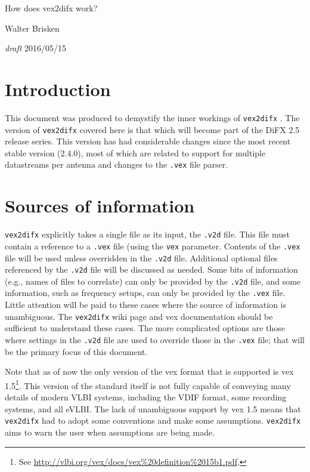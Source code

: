 \documentclass[12pt]{article}
\begin{document}
\newcommand{\vexdifx}{{\tt vex2difx} }
\newcommand{\vd}{{\tt .v2d} }
\newcommand{\vx}{{\tt .vex} }
\newcommand{\defname}{{\em def name} }
\newcommand{\fs}{{\tt /}}
\newcommand{\hy}{{\tt -}}
\newcommand{\us}{{\tt \_}}

\begin{center}
{\Large How does vex2difx work?}

\vspace{10pt}
Walter Brisken

\vspace{10pt}
{\em draft} 2016/05/15
\end{center}


\section{Introduction}

This document was produced to demystify the inner workings of \vexdifx.
The version of \vexdifx covered here is that which will become part of the DiFX 2.5 release series.
This version has had considerable changes since the most recent stable version (2.4.0), most of which are related to support for multiple datastreams per antenna and changes to the \vx file parser.

\section{Sources of information}

\vexdifx explicitly takes a single file as its input, the \vd file.
This file must contain a reference to a \vx file (using the {\tt vex} parameter.
Contents of the {\tt .vex} file will be used unless overridden in the {\tt .v2d} file.
Additional optional files referenced by the {\tt .v2d} file will be discussed as needed.
Some bits of information (e.g., names of files to correlate) can only be provided by the \vd file, and some information, such as frequency setups, can only be provided by the \vx file.
Little attention will be paid to these cases where the source of information is unambiguous.
The \vexdifx wiki page and vex documentation should be sufficient to understand these cases.
The more complicated options are those where settings in the \vd file are used to override those in the \vx file; that will be the primary focus of this document.

Note that as of now the only version of the vex format that is supported is vex 1.5\footnote{See \url{http://vlbi.org/vex/docs/vex\%20definition\%2015b1.pdf}.}.
This version of the standard itself is not fully capable of conveying many details of modern VLBI systems, including the VDIF format, some recording systems, and all eVLBI.
The lack of unambiguous support by vex 1.5 means that \vexdifx had to adopt some conventions and make some assumptions.
\vexdifx aims to warn the user when assumptions are being made.
\end{document}
